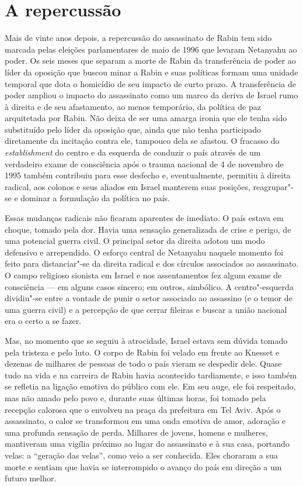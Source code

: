 \section{A repercussão}

Mais de vinte anos depois, a repercussão do assassinato de Rabin tem
sido marcada pelas eleições parlamentares de maio de 1996 que levaram
Netanyahu ao poder. Os seis meses que separam a morte de Rabin da
transferência de poder ao líder da oposição que buscou minar a Rabin e
suas políticas formam uma unidade temporal que dota o homicídio de
seu impacto de curto prazo. A transferência de poder ampliou o impacto
do assassinato como um marco da deriva de Israel rumo à direita e de seu
afastamento, ao menos temporário, da política de paz arquitetada por
Rabin. Não deixa de ser uma amarga ironia que ele tenha sido substituído
pelo líder da oposição que, ainda que não tenha participado diretamente
da incitação contra ele, tampouco dela se afastou. O fracasso do
\textit{establishment} do centro e da esquerda de conduzir o país através
de um verdadeiro exame de consciência após o trauma nacional de 4 de
novembro de 1995 também contribuiu para esse desfecho e, eventualmente,
permitiu à direita radical, aos colonos e seus aliados em Israel
manterem suas posições, reagrupar"-se e dominar a formulação da política
no país.

Essas mudanças radicais não ficaram aparentes de imediato. O país estava
em choque, tomado pela dor. Havia uma sensação generalizada de crise e
perigo, de uma potencial guerra civil. O principal setor da direita
adotou um modo defensivo e arrependido. O esforço central de Netanyahu
naquele momento foi feito para distanciar"-se da direita radical e dos
círculos associados ao assassinato. O campo religioso sionista em Israel
e nos assentamentos fez algum exame de consciência --- em alguns casos
sincero; em outros, simbólico. A centro"-esquerda dividiu"-se entre a
vontade de punir o setor associado ao assassino (e o temor de uma
guerra civil) e a percepção de que cerrar fileiras e buscar a união
nacional era o certo a se fazer.

Mas, no momento que se seguiu à atrocidade, Israel estava sem dúvida
tomado pela tristeza e pelo luto. O corpo de Rabin foi velado em frente
ao Knesset e dezenas de milhares de pessoas de todo o país vieram se
despedir dele. Quase tudo na vida e na carreira de Rabin havia
acontecido tardiamente, e isso também se refletia na ligação emotiva do
público com ele. Em seu auge, ele foi respeitado, mas não amado pelo
povo e, durante suas últimas horas, foi tomado pela recepção
calorosa que o envolveu na praça da prefeitura em Tel Aviv. Após o
assassinato, o calor se transformou em uma onda emotiva de amor,
adoração e uma profunda sensação de perda. Milhares de jovens, homens e
mulheres, mantiveram uma vigília próximo ao lugar do assassinato e à sua
casa, portando velas: a ``geração das velas'', como veio a ser
conhecida. Eles choraram a sua morte e sentiam que havia se interrompido
o avanço do país em direção a um futuro melhor.


